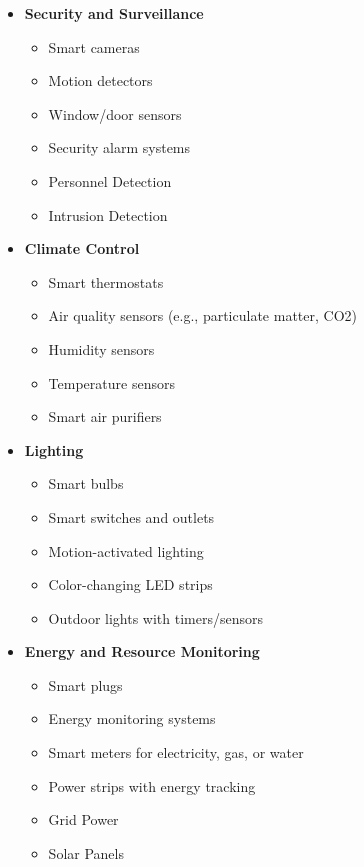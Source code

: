 \documentclass[10pt, journal]{IEEEtran} %
\begin{document}
\begin{itemize}[]
    \item{\textbf{Security and Surveillance}}
        \begin{itemize}
            \item Smart cameras
            \item Motion detectors
            \item Window/door sensors
            \item Security alarm systems
            \item Personnel Detection
            \item Intrusion Detection
        \end{itemize}

    \item{\textbf{Climate Control}}
        \begin{itemize}
            \item Smart thermostats
            \item Air quality sensors (e.g., particulate matter, CO2)
            \item Humidity sensors
            \item Temperature sensors
            \item Smart air purifiers
        \end{itemize}

    \item{\textbf{Lighting}}
        \begin{itemize}
            \item Smart bulbs
            \item Smart switches and outlets
            \item Motion-activated lighting
            \item Color-changing LED strips
            \item Outdoor lights with timers/sensors
        \end{itemize}

    \item{\textbf{Energy and Resource Monitoring}}
        \begin{itemize}
            \item Smart plugs
            \item Energy monitoring systems
            \item Smart meters for electricity, gas, or water
            \item Power strips with energy tracking
            \item Grid Power
            \item Solar Panels
        \end{itemize}


\end{itemize}
\end{document}
